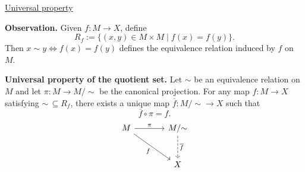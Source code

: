 \medskip
\noindent\underline{Universal property}

\noindent\textbf{Observation.} Given $f:M\to X$, define
\[
 R_f:=\{(x,y)\in M\times M\mid f(x)=f(y)\}.
\]
Then $x\sim y\iff f(x)=f(y)$ defines the equivalence relation
induced by $f$ on $M$.

\noindent{}\quad \textbf{Universal property of the quotient set.}
Let $\sim$ be an equivalence relation on $M$ and let
$\pi:M\to M/{\sim}$ be the canonical projection.
For any map $f:M\to X$ satisfying $\sim\,\subseteq R_f$,
there exists a unique map $\overline f:M/{\sim}\to X$ such that
\[
 \overline f\circ\pi=f.
\]
\[
\begin{tikzcd}[column sep=large,row sep=large]
 M\arrow[r,"\pi"]\arrow[dr,"f"']
   & M/{\sim}\arrow[d,dashed,"{\overline f}"]\\
 & X
\end{tikzcd}
\]

\endgroup
